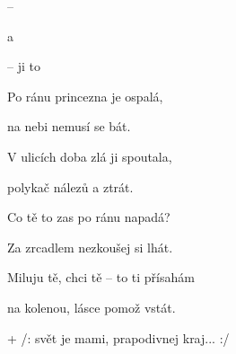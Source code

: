

\zs
{}  

 --  

  

  a 
\ks

\zr
{}  

 

  -- ji to 

  
\kr

\zs
Po ránu princezna je ospalá,

na nebi nemusí se bát.

V ulicích doba zlá ji spoutala,

polykač nálezů a ztrát.
\ks

\zr\kr

\zs
Co tě to zas po ránu napadá?

Za zrcadlem nezkoušej si lhát.

Miluju tě, chci tě -- to ti přísahám

na kolenou, lásce pomož vstát.
\ks

\zr\kr

+ /: svět je mami, prapodivnej kraj... :/

\kp
